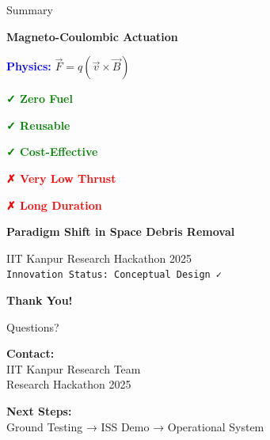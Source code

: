\documentclass[aspectratio=169]{beamer}
\begin{document}
\begin{frame}{Summary}
\begin{center}
\LARGE\textbf{Magneto-Coulombic Actuation}

\vspace{2em}

\Large
\textcolor{blue}{\textbf{Physics:}} $\vec{F} = q(\vec{v} \times \vec{B})$

\vspace{1em}

\textcolor{green}{\textbf{✓ Zero Fuel}}

\textcolor{green}{\textbf{✓ Reusable}}

\textcolor{green}{\textbf{✓ Cost-Effective}}

\vspace{1em}

\textcolor{red}{\textbf{✗ Very Low Thrust}}

\textcolor{red}{\textbf{✗ Long Duration}}

\vspace{2em}

\textbf{Paradigm Shift in Space Debris Removal}

\vspace{1em}

\normalsize
IIT Kanpur Research Hackathon 2025\\
\texttt{Innovation Status: Conceptual Design ✓}
\end{center}
\end{frame}

\begin{frame}
\begin{center}
\Huge\textbf{Thank You!}

\vspace{2em}

\Large Questions?

\vspace{2em}

\normalsize
\textbf{Contact:}\\
IIT Kanpur Research Team\\
Research Hackathon 2025

\vspace{1em}

\textbf{Next Steps:}\\
Ground Testing → ISS Demo → Operational System
\end{center}
\end{frame}
\end{document}
